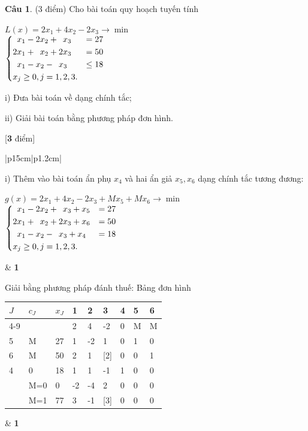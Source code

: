 \documentclass[12pt,a4letter]{article}
\theoremstyle{definition}
\newtheorem{cauhoi}{Câu}
\newenvironment{phandiem}{%
\par\noindent
\begin{longtable}[t]{|p{15cm}|p{1.2cm}|}
\hline
}{%
\end{longtable}
}
\newcommand\diem[1]{ & \hfil \textbf{#1} \\ \hline}
\newcommand\tongdiem[1]{\hfill [\textbf{#1} điểm]}
\begin{document}
\begin{cauhoi}%
(3 điểm)  
Cho bài toán quy hoạch tuyến tính
\begin{center}
$ L(x)=2x_1+4x_2-2x_3\rightarrow\min $ \\
 $ \begin{dcases}
\phantom{1}x_1-2x_2+\phantom{3}x_3&=27\\ 
2x_1+\phantom{2}x_2+2x_3&=50\\ 
\phantom{1}x_1-x_2-\phantom{3}x_3&\le 18\\ 
x_j\ge 0, j=1,2,3.&\\ 
\end{dcases} $
\end{center}

i) Đưa bài toán về dạng chính tắc;

ii) Giải bài toán bằng phương pháp đơn hình.

\begin{traloi}
\tongdiem{3}
\begin{phandiem}
i) Thêm vào bài toán  ẩn phụ $x_4$ và hai ẩn giả $x_5, x_6$ dạng chính tắc tương đương:

\begin{center}
$ g(x)=2x_1+4x_2-2x_3+Mx_5+Mx_6\rightarrow\min $ \\
 $ \begin{dcases}
\phantom{1}x_1-2x_2+\phantom{3}x_3+x_5&=27\\ 
2x_1+\phantom{2}x_2+2x_3+x_6&=50\\ 
\phantom{1}x_1-x_2-\phantom{3}x_3+x_4&= 18\\ 
x_j\ge 0, j=1,2,3.&\\ 
\end{dcases} $
\end{center}
\diem{1}

 Giải bằng phương pháp đánh thuế: 
Bảng đơn hình
\begin{center}
\renewcommand{\arraystretch}{1.25}
\begin{tabular}{| l | l | l | l  l  l  l  l  l   |}
\hline
$J$&$c_J$&$x_J$&1&2&3&4&5&6\\ 
\cline{4-9}
   &     &   &2&4 &-2&0&M&M\\ 
\hline
5&M     & 27     &1 &-2      & 1      & 0& 1&0\\
6&M     & 50     &2 &1      & [2]      & 0& 0&1\\
4&0     &  18    & 1 &1      &   -1      & 1& 0&0\\
\hline
&M=0& 0 &-2 &-4 &2  &0& 0&0\\
&M=1&77& 3  &-1&[3]&0&0& 0\\
\hline
\end{tabular}
\end{center}
\diem{1}


\end{phandiem}
\end{traloi}
\end{cauhoi}
\end{document}
